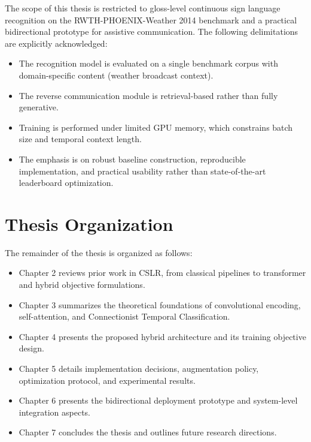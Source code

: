 The scope of this thesis is restricted to gloss-level continuous sign language recognition on the RWTH-PHOENIX-Weather 2014 benchmark and a practical bidirectional prototype for assistive communication. The following delimitations are explicitly acknowledged:
\begin{itemize}
    \item The recognition model is evaluated on a single benchmark corpus with domain-specific content (weather broadcast context).
    \item The reverse communication module is retrieval-based rather than fully generative.
    \item Training is performed under limited GPU memory, which constrains batch size and temporal context length.
    \item The emphasis is on robust baseline construction, reproducible implementation, and practical usability rather than state-of-the-art leaderboard optimization.
\end{itemize}

\section{Thesis Organization}

The remainder of the thesis is organized as follows:
\begin{itemize}
    \item Chapter 2 reviews prior work in CSLR, from classical pipelines to transformer and hybrid objective formulations.
    \item Chapter 3 summarizes the theoretical foundations of convolutional encoding, self-attention, and Connectionist Temporal Classification.
    \item Chapter 4 presents the proposed hybrid architecture and its training objective design.
    \item Chapter 5 details implementation decisions, augmentation policy, optimization protocol, and experimental results.
    \item Chapter 6 presents the bidirectional deployment prototype and system-level integration aspects.
    \item Chapter 7 concludes the thesis and outlines future research directions.
\end{itemize}
